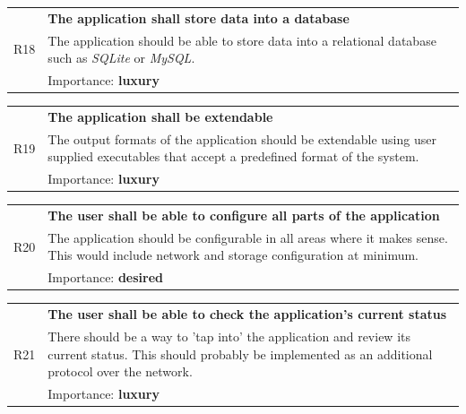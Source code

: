 \documentclass[12pt,a4paper,table]{article}
\begin{document}
                \vspace{0.5cm}
                \noindent
                \begin{tabular}{ p{0.7cm}|p{14.5cm} }
                    \multirow{3}{*}{R18} & \textbf{The application shall store data into a database}\\
                    \cline{2-2}
                    & The application should be able to store data into a relational database such as \textit{SQLite} or \textit{MySQL}.\\
                    \cline{2-2}
                    & Importance: \textbf{luxury}
                \end{tabular}

                \vspace{0.5cm}
                \noindent
                \begin{tabular}{ p{0.7cm}|p{14.5cm} }
                    \multirow{3}{*}{R19} & \textbf{The application shall be extendable}\\
                    \cline{2-2}
                    & The output formats of the application should be extendable using user supplied executables that accept a predefined format of the system.\\
                    \cline{2-2}
                    & Importance: \textbf{luxury}
                \end{tabular}

                \vspace{0.5cm}
                \noindent
                \begin{tabular}{ p{0.7cm}|p{14.5cm} }
                    \multirow{3}{*}{R20} & \textbf{The user shall be able to configure all parts of the application}\\
                    \cline{2-2}
                    & The application should be configurable in all areas where it makes sense. This would include network and storage configuration at minimum.\\
                    \cline{2-2}
                    & Importance: \textbf{desired}
                \end{tabular}

                \vspace{0.5cm}
                \noindent
                \begin{tabular}{ p{0.7cm}|p{14.5cm} }
                    \multirow{3}{*}{R21} & \textbf{The user shall be able to check the application's current status}\\
                    \cline{2-2}
                    & There should be a way to 'tap into' the application and review its current status. This should probably be implemented as an additional protocol over the network.\\
                    \cline{2-2}
                    & Importance: \textbf{luxury}
                \end{tabular}
\end{document}
